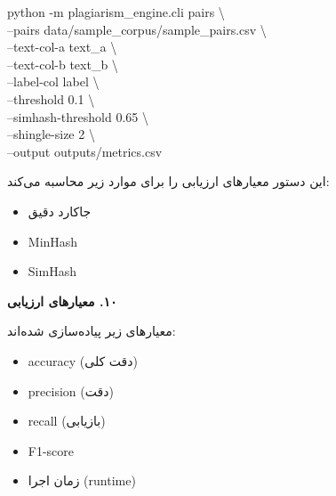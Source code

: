 \documentclass[11pt]{article}
\begin{document}
{\mycode
\begin{flushleft}
python -m plagiarism\_engine.cli pairs \textbackslash{} \\
\hspace*{1.10em}--pairs data/sample\_corpus/sample\_pairs.csv \textbackslash{} \\
\hspace*{1.10em}--text-col-a text\_a \textbackslash{} \\
\hspace*{1.10em}--text-col-b text\_b \textbackslash{} \\
\hspace*{1.10em}--label-col label \textbackslash{} \\
\hspace*{1.10em}--threshold 0.1 \textbackslash{} \\
\hspace*{1.10em}--simhash-threshold 0.65 \textbackslash{} \\
\hspace*{1.10em}--shingle-size 2 \textbackslash{} \\
\hspace*{1.10em}--output outputs/metrics.csv
\end{flushleft}}

\noindent ‏این دستور معیارهای ارزیابی را برای موارد زیر محاسبه می‌کند:\par

\begin{itemize}

\item ‏جاکارد دقیق

\item ‏MinHash

\item ‏SimHash

\end{itemize}

\medskip\noindent\hrulefill\medskip

\medskip
{\large\bfseries ‏۱۰. معیارهای ارزیابی}\medskip


\noindent ‏معیارهای زیر پیاده‌سازی شده‌اند:\par

\begin{itemize}

\item ‏accuracy (دقت کلی)

\item ‏precision (دقت)

\item ‏recall (بازیابی)

\item ‏F1-score

\item ‏زمان اجرا (runtime)

\end{itemize}
\end{document}
